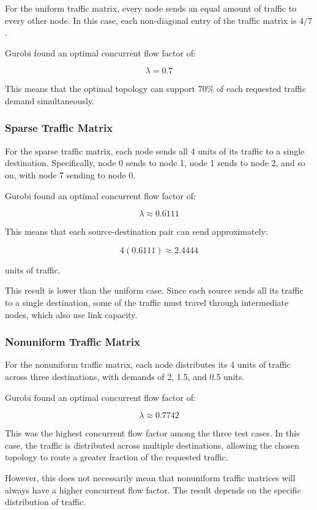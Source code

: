 \documentclass[11pt]{article}
\theoremstyle{definition}
\begin{document}
For the uniform traffic matrix, every node sends an equal amount of traffic to every other node. In this case, each non-diagonal entry of the traffic matrix is $4/7$.

Gurobi found an optimal concurrent flow factor of:

\[
\lambda = 0.7
\]

This means that the optimal topology can support 70\% of each requested traffic demand simultaneously.

\subsubsection{Sparse Traffic Matrix}

For the sparse traffic matrix, each node sends all 4 units of its traffic to a single destination. Specifically, node 0 sends to node 1, node 1 sends to node 2, and so on, with node 7 sending to node 0.

Gurobi found an optimal concurrent flow factor of:

\[
\lambda \approx 0.6111
\]

This means that each source-destination pair can send approximately:

\[
4(0.6111) \approx 2.4444
\]

units of traffic.

This result is lower than the uniform case. Since each source sends all its traffic to a single destination, some of the traffic must travel through intermediate nodes, which also use link capacity.

\subsubsection{Nonuniform Traffic Matrix}

For the nonuniform traffic matrix, each node distributes its 4 units of traffic across three destinations, with demands of 2, 1.5, and 0.5 units.

Gurobi found an optimal concurrent flow factor of:

\[
\lambda \approx 0.7742
\]

This was the highest concurrent flow factor among the three test cases. In this case, the traffic is distributed across multiple destinations, allowing the chosen topology to route a greater fraction of the requested traffic.

However, this does not necessarily mean that nonuniform traffic matrices will always have a higher concurrent flow factor. The result depends on the specific distribution of traffic.
\end{document}
